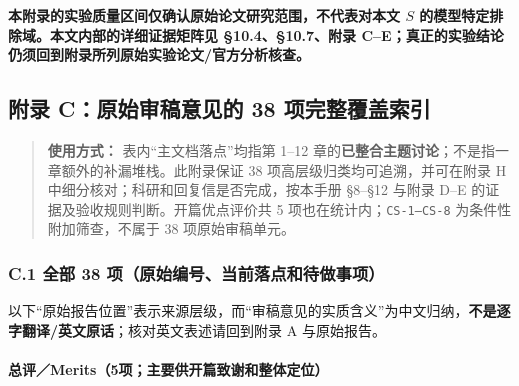 \documentclass[
]{article}
\begin{document}
\textbf{本附录的实验质量区间仅确认原始论文研究范围，不代表对本文 \(S\)
的模型特定排除域。本文内部的详细证据矩阵见 §10.4、§10.7、附录
C--E；真正的实验结论仍须回到附录所列原始实验论文/官方分析核查。}

\subsection{附录 C：原始审稿意见的 38
项完整覆盖索引}\label{ux9644ux5f55-cux539fux59cbux5ba1ux7a3fux610fux89c1ux7684-38-ux9879ux5b8cux6574ux8986ux76d6ux7d22ux5f15}

\begin{quote}
\textbf{使用方式：} 表内``主文档落点''均指第 1--12
章的\textbf{已整合主题讨论}；不是指一章额外的补漏堆栈。此附录保证 38
项高层级归类均可追溯，并可在附录 H
中细分核对；科研和回复信是否完成，按本手册 §8--§12 与附录 D--E
的证据及验收规则判断。开篇优点评价共 5 项也在统计内；\texttt{CS-1–CS-8}
为条件性附加筛查，不属于 38 项原始审稿单元。
\end{quote}

\subsubsection{C.1 全部 38
项（原始编号、当前落点和待做事项）}\label{c.1-ux5168ux90e8-38-ux9879ux539fux59cbux7f16ux53f7ux5f53ux524dux843dux70b9ux548cux5f85ux505aux4e8bux9879}

以下``原始报告位置''表示来源层级，而``审稿意见的实质含义''为中文归纳，\textbf{不是逐字翻译/英文原话}；核对英文表述请回到附录
A 与原始报告。

\paragraph{总评／Merits（5项；主要供开篇致谢和整体定位）}\label{ux603bux8bc4merits5ux9879ux4e3bux8981ux4f9bux5f00ux7bc7ux81f4ux8c22ux548cux6574ux4f53ux5b9aux4f4d}
\end{document}
